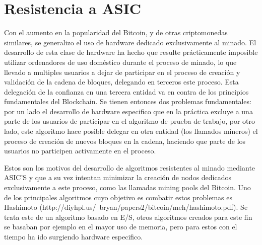 \section{Resistencia a ASIC}
Con el aumento en la popularidad del Bitcoin, y de otras criptomonedas similares, se generalizo el uso de hardware dedicado exclusivamente al minado. El desarrollo de esta clase de hardware ha hecho que resulte prácticamente imposible utilizar ordenadores de uso doméstico durante el proceso de minado, lo que llevado a multiples usuarios a dejar de participar en el proceso de creación y validación de la cadena de bloques, delegando en terceros este proceso. Esta delegación de la confianza en una tercera entidad va en contra de los principios fundamentales del Blockchain. Se tienen entonces dos problemas fundamentales: por un lado el desarrollo de hardware especifico que en la práctica excluye a una parte de los usuarios de participar en el algoritmo de prueba de trabajo, por otro lado, este algoritmo hace posible delegar en otra entidad (los llamados mineros) el proceso de creación de nuevos bloques en la cadena, haciendo que parte de los usuarios no participen activamente en el proceso.
\begin{figure}[H]
  \qquad
	\label{fig:test}%
\end{figure}
Estos son los motivos del desarrollo de algoritmos resistentes al minado mediante ASIC’S y que a su vez intentan minimizar la creación de nodos dedicados exclusivamente a este proceso, como las llamadas mining pools del Bitcoin. Uno de los principales algoritmos cuyo objetivo es combatir estos problemas es Hashimoto (http://diyhpl.us/~bryan/papers2/bitcoin/meh/hashimoto.pdf). Se trata este de un algoritmo basado en E/S, otros algoritmos creados para este fin se basaban por ejemplo en el mayor uso de memoria, pero para estos con el tiempo ha ido surgiendo hardware especifico.

